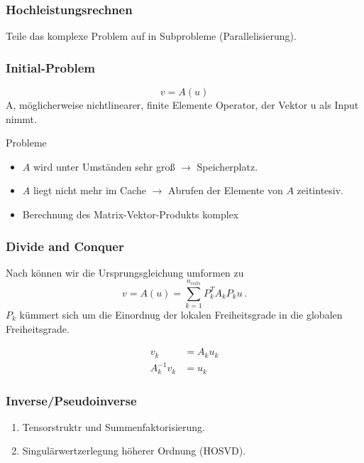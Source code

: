 \begin{frame}
\frametitle{Hochleistungsrechnen}
\begin{framed}
\end{framed} 
Teile das komplexe Problem auf in Subprobleme (Parallelisierung).
\end{frame}


\begin{frame}
\frametitle{Initial-Problem}
\begin{framed}
\begin{equation*}
v = A(u)
\end{equation*}
A, möglicherweise nichtlinearer, finite Elemente Operator, der Vektor u als Input nimmt.
\end{framed}
Probleme 
\begin{itemize}
\item $A$ wird unter Umständen sehr groß $\rightarrow$ Speicherplatz.
\item $A$ liegt nicht mehr im Cache $\rightarrow$ Abrufen der Elemente von $A$ zeitintesiv. 
\item Berechnung des Matrix-Vektor-Produkts komplex
\end{itemize}
\end{frame}

\begin{frame}
\frametitle{Divide and Conquer}
Nach \cite{Kronbichler} können wir die Ursprungsgleichung umformen zu
\begin{equation*}
v = A(u) = \sum\limits_{k=1}^{n_{cells}} P_k^T A_k P_k u \, .
\end{equation*}
$P_k$ kümmert sich um die Einordnug der lokalen Freiheitsgrade in die globalen Freiheitsgrade.
\begin{framed}
\begin{align*}
v_k &= A_k u_k \\
A_k^{-1} v_k &= u_k
\end{align*}
\end{framed}
\end{frame}

\begin{frame}
\frametitle{Inverse/Pseudoinverse}
\begin{enumerate}
\item Tensorstruktr und Summenfaktorisierung.
\item Singulärwertzerlegung höherer Ordnung (HOSVD).
\end{enumerate}

\end{frame}